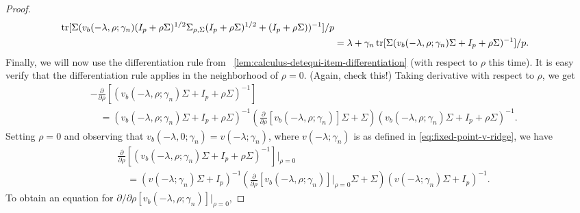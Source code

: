 \documentclass{article}
\begin{document}
\begin{proof}
\begin{align}
       \operatorname{tr}[ \Sigma 
       (v_b(-\lambda, \rho; \gamma_n) 
       (I_p + \rho \Sigma)^{1/2} \Sigma_{\rho, \Sigma} (I_p + \rho \Sigma)^{1/2} 
       + (I_p + \rho \Sigma))^{-1}] / p \nonumber \\
       &=
       \lambda + \gamma_n
       \operatorname{tr}[\Sigma (v_b(-\lambda, \rho; \gamma_n) \Sigma + I_p + \rho \Sigma)^{-1}] / p. \label{eq:fixed-point-vg-with-rho}
   \end{align}
   Finally, we will now use
  the differentiation rule 
    from ~\eqref{lem:calculus-detequi-item-differentiation}
   (with respect to $\rho$ this time).
   It is easy verify that the differentiation rule applies
   in the neighborhood of $\rho = 0$.
    (Again, check this!)
    Taking derivative with respect to $\rho$,
    we get
   \begin{equation}
        \label{eq:deriv-detequi-genbias-ridge}
        \begin{split}
        &-
        \frac{\partial}{\partial \rho}
        [ ( v_b(-\lambda, \rho; \gamma_n) \Sigma + I_p + \rho \Sigma )^{-1} ] \\
        &\quad = (v_b(-\lambda, \rho; \gamma_n) \Sigma + I_p + \rho \Sigma)^{-1}
        \left(\frac{\partial}{\partial \rho}[v_b(-\lambda, \rho; \gamma_n)] \Sigma + \Sigma\right)
        (v_b(-\lambda, \rho; \gamma_n) \Sigma + I_p + \rho \Sigma)^{-1}.
        \end{split}
   \end{equation}
   Setting $\rho = 0$ and observing that
   $v_b(-\lambda, 0; \gamma_n) = v(-\lambda; \gamma_n)$,
   where $v(-\lambda; \gamma_n)$ is as defined in \eqref{eq:fixed-point-v-ridge},
    we have
    \begin{equation}
        \label{eq:deriv-detequi-genbias-ridge-rho0}
        \begin{split}
        &\frac{\partial}{\partial \rho}
        [
        (v_b(-\lambda, \rho; \gamma_n) \Sigma + I_p + \rho \Sigma)^{-1}
        ] \mathrel{\Big |}_{\rho = 0} \\
        &\quad = 
        (v(-\lambda; \gamma_n) \Sigma + I_p)^{-1}
        \left( 
            \frac{\partial}{\partial \rho}[v_b(-\lambda, \rho; \gamma_n)] 
            \mathrel{\Big|}_{\rho = 0} 
            \Sigma  + \Sigma 
        \right)
        (v(-\lambda; \gamma_n) \Sigma + I_p)^{-1}.
        \end{split}
    \end{equation}
    To obtain an equation for 
    $\partial / \partial \rho [v_b(-\lambda, \rho; \gamma_n)] |_{\rho = 0}$,

\end{proof}
\end{document}
